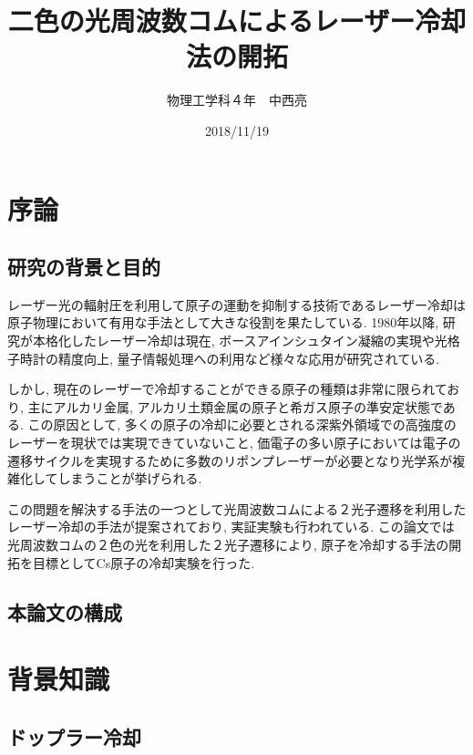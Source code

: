 \documentclass[uplatex, dvipdfmx, a4paper, report, papersize, 11pt]{jsbook}
\title{二色の光周波数コムによるレーザー冷却法の開拓}
\author{物理工学科４年　中西亮}
\date{2018/11/19}
\begin{document}
\maketitle
\newpage

\setcounter{tocdepth}{2}
\tableofcontents


\newpage
\chapter{序論}
\section{研究の背景と目的}
レーザー光の輻射圧を利用して原子の運動を抑制する技術であるレーザー冷却は原子物理において有用な手法として大きな役割を果たしている. 1980年以降, 研究が本格化したレーザー冷却は現在, ボースアインシュタイン凝縮の実現や光格子時計の精度向上, 量子情報処理への利用など様々な応用が研究されている. \cite{レーザー冷却とその応用}\par
しかし, 現在のレーザーで冷却することができる原子の種類は非常に限られており, 主にアルカリ金属, アルカリ土類金属の原子と希ガス原子の準安定状態である. \cite{PhysRevA.73.063407}この原因として, 多くの原子の冷却に必要とされる深紫外領域での高強度のレーザーを現状では実現できていないこと, 価電子の多い原子においては電子の遷移サイクルを実現するために多数のリポンプレーザーが必要となり光学系が複雑化してしまうことが挙げられる.\par
この問題を解決する手法の一つとして光周波数コムによる２光子遷移を利用したレーザー冷却の手法が提案されており, 実証実験も行われている\cite{PhysRevX.6.041004}\cite{PhysRevA.73.063407}. この論文では光周波数コムの２色の光を利用した２光子遷移により, 原子を冷却する手法の開拓を目標としてCs原子の冷却実験を行った.\\



\section{本論文の構成}

\newpage

\chapter{背景知識}

\section{ドップラー冷却}
\end{document}
